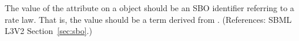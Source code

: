 The value of the attribute  on a \KineticLaw object should
be an SBO identifier referring to a rate law.  That is, the value should be
a term derived from \sboratelaw.  (References: SBML L3V2
Section~\ref{sec:sbo}.)
